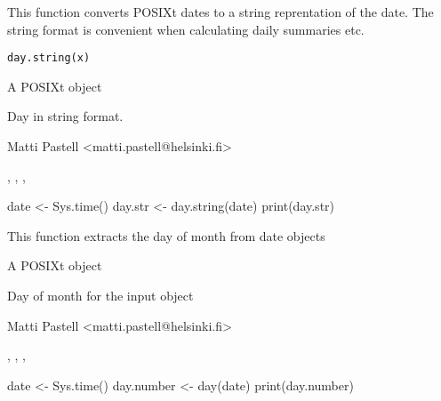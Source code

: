 \documentclass{book}
\begin{document}
\begin{Description}\relax
This function converts POSIXt dates to a string reprentation of the
date. The string format is convenient when calculating daily summaries etc.
\end{Description}
\begin{Usage}
\begin{verbatim}
day.string(x)
\end{verbatim}
\end{Usage}
\begin{Arguments}
\begin{ldescription}
\item[\code{x}] A POSIXt object
\end{ldescription}
\end{Arguments}
\begin{Value}
Day in string format.
\end{Value}
\begin{Author}\relax
Matti Pastell <matti.pastell@helsinki.fi>
\end{Author}
\begin{SeeAlso}\relax
{}, ,
, 
\end{SeeAlso}
\begin{Examples}
\begin{ExampleCode}
date <- Sys.time()
day.str <- day.string(date)
print(day.str)
\end{ExampleCode}
\end{Examples}

\begin{Description}\relax
This function extracts the day of month from date objects
\end{Description}
\begin{Arguments}
\begin{ldescription}
\item[\code{x}] A POSIXt object
\end{ldescription}
\end{Arguments}
\begin{Value}
\begin{ldescription}
\item[\code{day}] Day of month for the input object
\end{ldescription}
\end{Value}
\begin{Author}\relax
Matti Pastell <matti.pastell@helsinki.fi>
\end{Author}
\begin{SeeAlso}\relax
{}, ,
, 
\end{SeeAlso}
\begin{Examples}
\begin{ExampleCode}
date <- Sys.time()
day.number <- day(date)
print(day.number)
\end{ExampleCode}
\end{Examples}
\end{document}
